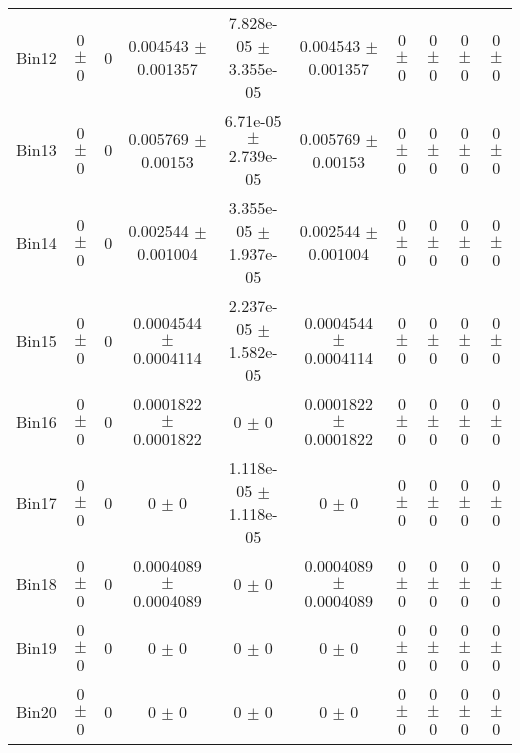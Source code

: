 \begin{tabular}{@{\extracolsep{4pt}}lccccccccc@{}}
     Bin12 & 0 $\pm$ 0 & 0 & 0.004543 $\pm$ 0.001357 & 7.828e-05 $\pm$ 3.355e-05 & 0.004543 $\pm$ 0.001357 & 0 $\pm$ 0 & 0 $\pm$ 0 & 0 $\pm$ 0 & 0 $\pm$ 0 \\ 
     Bin13 & 0 $\pm$ 0 & 0 & 0.005769 $\pm$ 0.00153 & 6.71e-05 $\pm$ 2.739e-05 & 0.005769 $\pm$ 0.00153 & 0 $\pm$ 0 & 0 $\pm$ 0 & 0 $\pm$ 0 & 0 $\pm$ 0 \\ 
     Bin14 & 0 $\pm$ 0 & 0 & 0.002544 $\pm$ 0.001004 & 3.355e-05 $\pm$ 1.937e-05 & 0.002544 $\pm$ 0.001004 & 0 $\pm$ 0 & 0 $\pm$ 0 & 0 $\pm$ 0 & 0 $\pm$ 0 \\ 
     Bin15 & 0 $\pm$ 0 & 0 & 0.0004544 $\pm$ 0.0004114 & 2.237e-05 $\pm$ 1.582e-05 & 0.0004544 $\pm$ 0.0004114 & 0 $\pm$ 0 & 0 $\pm$ 0 & 0 $\pm$ 0 & 0 $\pm$ 0 \\ 
     Bin16 & 0 $\pm$ 0 & 0 & 0.0001822 $\pm$ 0.0001822 & 0 $\pm$ 0 & 0.0001822 $\pm$ 0.0001822 & 0 $\pm$ 0 & 0 $\pm$ 0 & 0 $\pm$ 0 & 0 $\pm$ 0 \\ 
     Bin17 & 0 $\pm$ 0 & 0 & 0 $\pm$ 0 & 1.118e-05 $\pm$ 1.118e-05 & 0 $\pm$ 0 & 0 $\pm$ 0 & 0 $\pm$ 0 & 0 $\pm$ 0 & 0 $\pm$ 0 \\ 
     Bin18 & 0 $\pm$ 0 & 0 & 0.0004089 $\pm$ 0.0004089 & 0 $\pm$ 0 & 0.0004089 $\pm$ 0.0004089 & 0 $\pm$ 0 & 0 $\pm$ 0 & 0 $\pm$ 0 & 0 $\pm$ 0 \\ 
     Bin19 & 0 $\pm$ 0 & 0 & 0 $\pm$ 0 & 0 $\pm$ 0 & 0 $\pm$ 0 & 0 $\pm$ 0 & 0 $\pm$ 0 & 0 $\pm$ 0 & 0 $\pm$ 0 \\ 
     Bin20 & 0 $\pm$ 0 & 0 & 0 $\pm$ 0 & 0 $\pm$ 0 & 0 $\pm$ 0 & 0 $\pm$ 0 & 0 $\pm$ 0 & 0 $\pm$ 0 & 0 $\pm$ 0 \\ 
\hline\hline
  \end{tabular}
